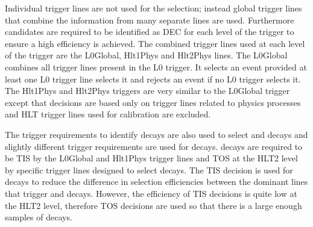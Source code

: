 Individual trigger lines are not used for the selection; instead global trigger lines that combine the information from many separate lines are used. Furthermore candidates are required to be identified as DEC for each level of the trigger to ensure a high efficiency is achieved. The combined trigger lines used at each level of the trigger are the L0Global, Hlt1Phys and Hlt2Phys lines. 
The L0Global combines all trigger lines present in the L0 trigger. It selects an event provided at least one L0 trigger line selects it and rejects an event if no L0 trigger selects it. The Hlt1Phys and Hlt2Phys triggers are very similar 
to the L0Global trigger except that decisions are based only on trigger lines related to physics processes and HLT trigger lines used
 for calibration are excluded.


The trigger requirements to identify \bmumu decays are also used to select \bujpsik and \bsjpsiphi decays and slightly different trigger requirements are used for \bhh decays. \bhh decays are required to be TIS by the L0Global and Hlt1Phys trigger lines and TOS at the HLT2 level by specific trigger lines designed to select \bhh decays. The TIS decision is used for \bhh decays to reduce the difference in selection efficiencies between the dominant lines that trigger \bhh and \bmumu decays. However, the efficiency of TIS decisions is quite low at the HLT2 level, therefore TOS decisions are used so that there is a large enough samples of decays. %


